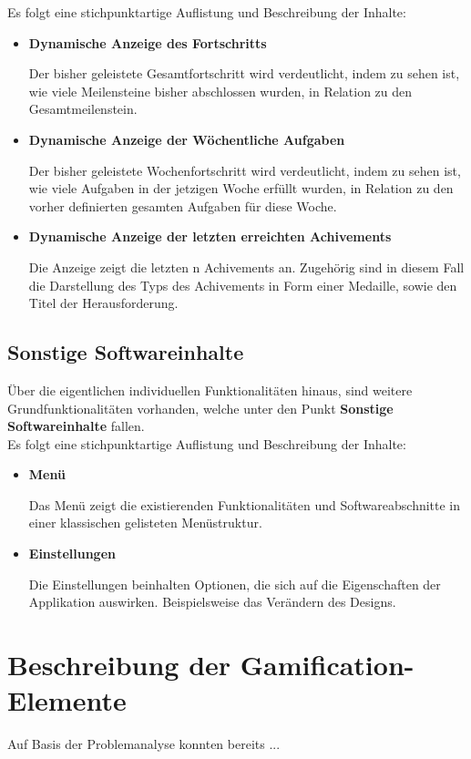 \documentclass{scrreprt}
\begin{document}
\par Es folgt eine stichpunktartige Auflistung und Beschreibung der Inhalte:
\begin{itemize}
\item \textbf{Dynamische Anzeige des Fortschritts}
\par Der bisher geleistete Gesamtfortschritt wird verdeutlicht, indem zu sehen ist, wie viele Meilensteine bisher abschlossen wurden, in Relation zu den Gesamtmeilenstein.
\item \textbf{Dynamische Anzeige der Wöchentliche Aufgaben}
\par Der bisher geleistete Wochenfortschritt wird verdeutlicht, indem zu sehen ist, wie viele Aufgaben in der jetzigen Woche erfüllt wurden, in Relation zu den vorher definierten gesamten Aufgaben für diese Woche.
\item \textbf{Dynamische Anzeige der letzten erreichten Achivements}
\par Die Anzeige zeigt die letzten n Achivements an. Zugehörig sind in diesem Fall die Darstellung des Typs des Achivements in Form einer Medaille, sowie den Titel der Herausforderung.
\end{itemize}

\subsection{Sonstige Softwareinhalte}
\par Über die eigentlichen individuellen Funktionalitäten hinaus, sind weitere Grundfunktionalitäten vorhanden, welche unter den Punkt \textbf{Sonstige Softwareinhalte} fallen.\\

Es folgt eine stichpunktartige Auflistung und Beschreibung der Inhalte:
\begin{itemize}
\item \textbf{Menü}
\par Das Menü zeigt die existierenden Funktionalitäten und Softwareabschnitte in einer klassischen gelisteten Menüstruktur.
\item \textbf{Einstellungen}
\par Die Einstellungen beinhalten Optionen, die sich auf die Eigenschaften der Applikation auswirken. Beispielsweise das Verändern des Designs.
\end{itemize}

\section{Beschreibung der Gamification-Elemente}
Auf Basis der Problemanalyse konnten bereits ...
\end{document}
